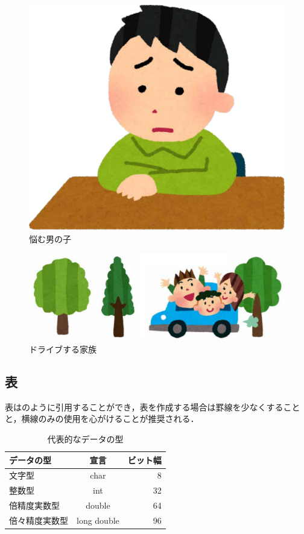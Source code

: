 \documentclass[a4paper,10pt,twocolumn,uplatex]{jsarticle}
\begin{document}
\begin{figure}[!tb]
  \centering
  \includegraphics[width=\linewidth]{img/sample1.pdf}
  \caption{悩む男の子}
  \label{fig:sample1}
\end{figure}

\begin{figure}[!tb]
  \centering
  \includegraphics[width=\linewidth]{img/sample2.pdf}
  \caption{ドライブする家族}
  \label{fig:sample2}
\end{figure}

\subsection{表}
表はのように引用することができ，表を作成する場合は罫線を少なくすることと，横線のみの使用を心がけることが推奨される．

\begin{table}[!bt]
  \caption{代表的なデータの型}
  \label{tab:data_type}
  \centering
  \begin{tabular}{lcr}
    \hline
    データの型     & 宣言        & ビット幅 \\
    \hline \hline
    文字型         & char        & 8        \\
    整数型         & int         & 32       \\
    倍精度実数型   & double      & 64       \\
    倍々精度実数型 & long double & 96       \\
    \hline
  \end{tabular}
\end{table}
\end{document}
